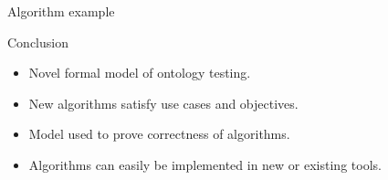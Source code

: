 \documentclass[final,fleqn]{beamer}
\begin{document}
\begin{frame}{}
\begin{columns}[onlytextwidth]
\begin{column}{.45\linewidth}
\begin{minipage}[t][.65\paperheight][s]{\columnwidth}
\begin{block}{Algorithm example}
      \end{block}
      \vfill
      \begin{block}{Conclusion\phantom{y}}
        \begin{itemize}
          \item Novel formal model of ontology testing.
          \vspace{1ex}
          \item New algorithms satisfy use cases and objectives.
          \vspace{1ex}
          \item Model used to prove correctness of algorithms.
          \vspace{1ex}
          \item Algorithms can easily be implemented in new or existing tools.
        \end{itemize}
      \end{block}
      \vspace{2cm}
    \end{minipage}
  \end{column}
\end{columns}

\end{frame}
\end{document}

